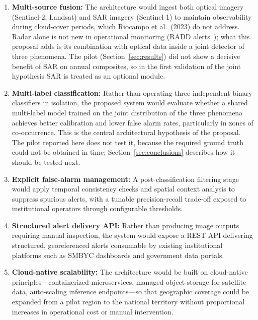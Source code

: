 \documentclass{article}
\begin{document}
\begin{enumerate}
    \item \textbf{Multi-source fusion:} The architecture would ingest both
    optical imagery (Sentinel-2, Landsat) and SAR imagery (Sentinel-1) to
    maintain observability during cloud-cover periods, which Riocampo et al.\
    (2023) do not address. Radar alone is not new in operational monitoring
    (RADD alerts~\cite{reiche2021radd}); what this proposal adds is its
    combination with optical data inside a joint detector of three phenomena. The pilot (Section~\ref{sec:results}) did not show a
    decisive benefit of SAR on annual composites, so in the first validation of
    the joint hypothesis SAR is treated as an optional module.
    \item \textbf{Multi-label classification:} Rather than operating three
    independent binary classifiers in isolation, the proposed system would
    evaluate whether a shared multi-label model trained on the joint
    distribution of the three phenomena achieves better calibration and lower
    false alarm rates, particularly in zones of co-occurrence. This is the
    central architectural hypothesis of the proposal. The pilot reported here
    does not test it, because the required ground truth could not be obtained
    in time; Section~\ref{sec:conclusions} describes how it should be tested
    next.
    \item \textbf{Explicit false-alarm management:} A post-classification
    filtering stage would apply temporal consistency checks and spatial
    context analysis to suppress spurious alerts, with a tunable
    precision-recall trade-off exposed to institutional operators through
    configurable thresholds.
    \item \textbf{Structured alert delivery API:} Rather than producing image
    outputs requiring manual inspection, the system would expose a REST API
    delivering structured, georeferenced alerts consumable by existing
    institutional platforms such as SMBYC dashboards and government data
    portals.
    \item \textbf{Cloud-native scalability:} The architecture would be built
    on cloud-native principles---containerized microservices, managed object
    storage for satellite data, auto-scaling inference endpoints---so that
    geographic coverage could be expanded from a pilot region to the national
    territory without proportional increases in operational cost or manual
    intervention.
\end{enumerate}
\end{document}
